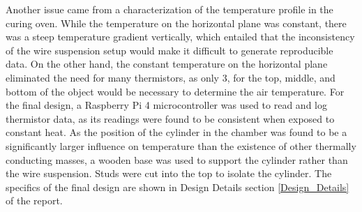 Another issue came from a characterization of the temperature profile in the curing oven. While the temperature on the horizontal plane was constant, there was a steep temperature gradient vertically, which entailed that the inconsistency of the wire suspension setup would make it difficult to generate reproducible data. On the other hand, the constant temperature on the horizontal plane eliminated the need for many thermistors, as only 3, for the top, middle, and bottom of the object would be necessary to determine the air temperature. 
For the final design, a Raspberry Pi 4 microcontroller was used to read and log thermistor data, as its readings were found to be consistent when exposed to constant heat. As the position of the cylinder in the chamber was found to be a significantly larger influence on temperature than the existence of other thermally conducting masses, a wooden base was used to support the cylinder rather than the wire suspension. Studs were cut into the top to isolate the cylinder. The specifics of the final design are shown in Design Details section \ref{Design_Details} of the report.
